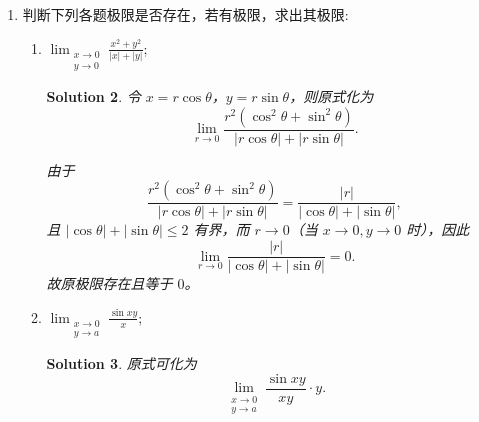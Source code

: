 \documentclass[a4paper,12pt]{article}
\newtheorem*{sol}{Solution}
\begin{document}
\begin{enumerate}
\begin{sol}
                  \begin{itemize}
                        \item 计算 $f[\varphi(x,y),\psi(x,y)]$：
                              $$
                                    f[\varphi(x,y),\psi(x,y)] = f(x+y, x-y) = (x+y)^{x-y}.
                              $$

                        \item 计算 $\varphi[f(x,y),\psi(x,y)]$：
                              $$
                                    \varphi[f(x,y),\psi(x,y)] = \varphi(x^y, x-y) = x^y + (x-y) = x^y + x - y.
                              $$

                        \item 计算 $\psi[\varphi(x,y),f(x,y)]$：
                              $$
                                    \psi[\varphi(x,y),f(x,y)] = \psi(x+y, x^y) = (x+y) - x^y = x + y - x^y.
                              $$
                  \end{itemize}
            \end{sol}

      \item[14.] 判断下列各题极限是否存在，若有极限，求出其极限:
            \begin{enumerate}[label=(\arabic*)]
                  \item $\lim_{\substack{x \to 0 \\ y \to 0}} \frac{x^2 + y^2}{|x| + |y|}$;
                        \begin{sol}
                              令 $x = r\cos\theta$，$y = r\sin\theta$，则原式化为
                              $$
                                    \lim_{r\to 0} \frac{r^2(\cos^2\theta+\sin^2\theta)}{|r\cos\theta| + |r\sin\theta|}.
                              $$

                              由于
                              $$
                                    \frac{r^2(\cos^2\theta+\sin^2\theta)}{|r\cos\theta| + |r\sin\theta|} = \frac{|r|}{|\cos\theta| + |\sin\theta|},
                              $$
                              且 $|\cos\theta| + |\sin\theta| \leq 2$ 有界，而 $r \to 0$（当 $x \to 0, y \to 0$ 时），因此
                              $$
                                    \lim_{r\to 0}\frac{|r|}{|\cos\theta| + |\sin\theta|} = 0.
                              $$
                              故原极限存在且等于 $0$。
                        \end{sol}
                  \item $\lim_{\substack{x \to 0 \\ y \to a}} \frac{\sin xy}{x}$;
                        \begin{sol}
                              原式可化为
                              $$
                                    \lim_{\substack{x \to 0 \\ y \to a}} \frac{\sin xy}{xy} \cdot y.
                              $$


\end{sol}
\end{enumerate}
\end{enumerate}
\end{document}
